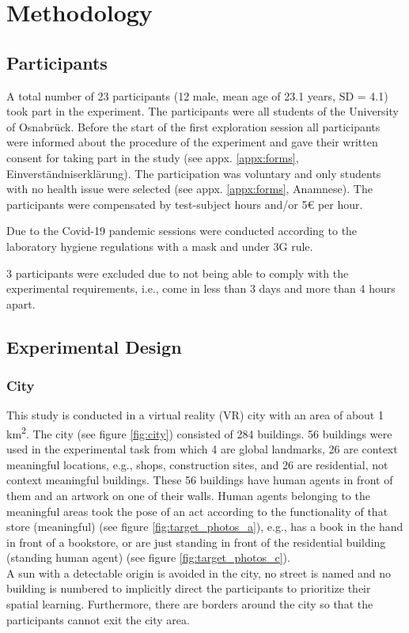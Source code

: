 \chapter{Methodology}

\section{Participants}

A total number of 23 participants (12 male, mean age of 23.1 years, SD = 4.1) took part in the experiment. The participants were all students of the University of Osnabrück. Before the start of the first exploration session all participants were informed about the procedure of the experiment and gave their written consent for taking part in the study (see appx. \ref{appx:forms}, Einverständniserklärung). The participation was voluntary and only students with no health issue were selected (see appx. \ref{appx:forms}, Anamnese). The participants were compensated by test-subject hours and/or 5€ per hour.  

Due to the Covid-19 pandemic sessions were conducted according to the laboratory hygiene regulations with a mask and under 3G rule.

3 participants were excluded due to not being able to comply with the experimental requirements, i.e., come in less than 3 days and more than 4 hours apart.



\section{Experimental Design}

\subsection{City}

This study is conducted in a virtual reality (VR) city with an area of about 1 km\textsuperscript2. The city (see figure \ref{fig:city}) consisted of 284 buildings. 56 buildings were used in the experimental task from which 4 are global landmarks, 26 are {\emphasize context meaningful} locations, e.g., shops, construction sites, and 26 are residential, {\emphasize not context meaningful} buildings. These 56 buildings have human agents in front of them and an artwork on one of their walls. Human agents belonging to the meaningful areas took the pose of an act according to the functionality of that store {\emphasize(meaningful)} (see figure \ref{fig:target_photos_a}), e.g., has a book in the hand in front of a bookstore, or are just standing in front of the residential building {\emphasize(standing human agent)} (see figure \ref{fig:target_photos_c}). \\
A sun with a detectable origin is avoided in the city, no street is named and no building is numbered to implicitly direct the participants to prioritize their spatial learning. Furthermore, there are borders around the city so that the participants cannot exit the city area.

